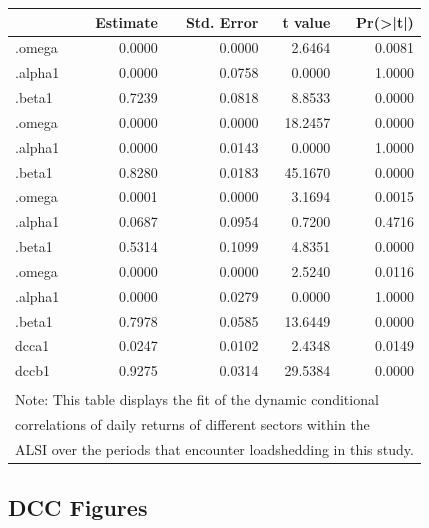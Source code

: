 \documentclass[11pt,preprint, authoryear]{elsarticle}
\let\origtable\table
\let\endorigtable\endtable
\renewenvironment{table}[1][2] {
    \expandafter\origtable\expandafter[H]
} {
    \endorigtable
}
\numberwithin{equation}{section}
\numberwithin{figure}{section}
\numberwithin{table}{section}
\begin{document}
\begin{table}

\caption{\label{tab:unnamed-chunk-9}DCC Model fit over Period of Load-Shedding \label{dccfitls}}
\centering
\fontsize{9}{11}\selectfont
\begin{tabular}[t]{l|r|r|r|r}
\hline
  &  Estimate &  Std. Error &  t value & Pr(>|t|)\\
\hline
[Financials].omega & 0.0000 & 0.0000 & 2.6464 & 0.0081\\
\hline
[Financials].alpha1 & 0.0000 & 0.0758 & 0.0000 & 1.0000\\
\hline
[Financials].beta1 & 0.7239 & 0.0818 & 8.8533 & 0.0000\\
\hline
[Industrials].omega & 0.0000 & 0.0000 & 18.2457 & 0.0000\\
\hline
[Industrials].alpha1 & 0.0000 & 0.0143 & 0.0000 & 1.0000\\
\hline
[Industrials].beta1 & 0.8280 & 0.0183 & 45.1670 & 0.0000\\
\hline
[Property].omega & 0.0001 & 0.0000 & 3.1694 & 0.0015\\
\hline
[Property].alpha1 & 0.0687 & 0.0954 & 0.7200 & 0.4716\\
\hline
[Property].beta1 & 0.5314 & 0.1099 & 4.8351 & 0.0000\\
\hline
[Resources].omega & 0.0000 & 0.0000 & 2.5240 & 0.0116\\
\hline
[Resources].alpha1 & 0.0000 & 0.0279 & 0.0000 & 1.0000\\
\hline
[Resources].beta1 & 0.7978 & 0.0585 & 13.6449 & 0.0000\\
\hline
[Joint]dcca1 & 0.0247 & 0.0102 & 2.4348 & 0.0149\\
\hline
[Joint]dccb1 & 0.9275 & 0.0314 & 29.5384 & 0.0000\\
\hline
\multicolumn{5}{l}{\textsuperscript{} Note: This table displays the fit of the dynamic conditional}\\
\multicolumn{5}{l}{correlations of daily returns of different sectors within the}\\
\multicolumn{5}{l}{ALSI over the periods that encounter loadshedding in this study.}\\
\end{tabular}
\end{table}

\hypertarget{dcc-figures}{%
\subsection{DCC Figures}\label{dcc-figures}}
\end{document}
